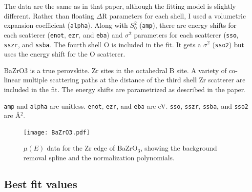 \documentclass[11pt]{article}
\begin{document}
The data are the same as in that paper, although the fitting model is
slightly different. Rather than floating $\Delta$R parameters for each
shell, I used a volumetric expansion coefficient
(\texttt{alpha}). Along with $S_0^2$ (\texttt{amp}), there are energy
shifts for each scatterer (\texttt{enot}, \texttt{ezr}, and
\texttt{eba}) and $\sigma^2$ parameters for each scatterer
(\texttt{sso}, \texttt{sszr}, and \texttt{ssba}.  The fourth shell O
is included in the fit. It gets a $\sigma^2$ (\texttt{sso2}) but uses
the energy shift for the O scatterer.

BaZrO3 is a true perovskite. Zr sites in the octahedral B site. A
variety of co-linear multiple scattering paths at the distance of the
third shell Zr scatterer are included in the fit. The energy shifts are
parametrized as described in the paper.

\texttt{amp} and \texttt{alpha} are unitless. \texttt{enot}, \texttt{ezr}, and \texttt{eba} are eV. \texttt{sso},
\texttt{sszr}, \texttt{ssba}, and \texttt{sso2} are {\AA}$^2$.

\begin{figure}[h]
  \centering
  \texttt{[image: BaZrO3.pdf]} 
  \caption{$\mu(E)$ data for the Zr edge of BaZrO$_3$, showing the
    background removal spline and the normalization polynomials.}
  \label{fig:bazro3-data}
\end{figure}


\subsection{Best fit values}
\label{sec:orgheadline26}
\end{document}
